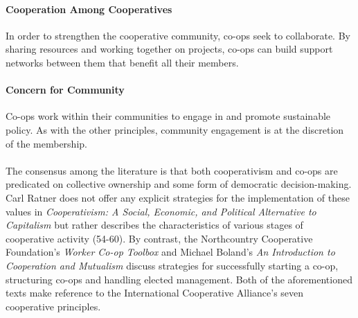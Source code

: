 \paragraph{Cooperation Among Cooperatives} In order to strengthen the cooperative community, co-ops seek to collaborate. By sharing resources and working together on projects, co-ops can build support networks between them that benefit all their members.

\paragraph{Concern for Community} Co-ops work within their communities to engage in and promote sustainable policy. As with the other principles, community engagement is at the discretion of the membership. 

\paragraph{} The consensus among the literature is that both cooperativism and co-ops are predicated on collective ownership and some form of democratic decision-making. Carl Ratner does not offer any explicit strategies for the implementation of these values in \textit{Cooperativism: A Social, Economic, and Political Alternative to Capitalism} but rather describes the characteristics of various stages of cooperative activity (54-60). By contrast, the Northcountry Cooperative Foundation's \textit{Worker Co-op Toolbox} and Michael Boland's \textit{An Introduction to Cooperation and Mutualism} discuss strategies for successfully starting a co-op, structuring co-ops and handling elected management. Both of the aforementioned texts make reference to the International Cooperative Alliance's seven cooperative principles.




